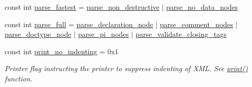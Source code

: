 \begin{DoxyCompactItemize}
\item 
const int \hyperlink{namespacerapidxml_a64da06dfdab7c86ca954bda4fecb978f}{parse\+\_\+fastest} = \hyperlink{namespacerapidxml_a45d4d8fef551beaaba23a83b847fd6a3}{parse\+\_\+non\+\_\+destructive} $\vert$ \hyperlink{namespacerapidxml_ac2d21ef14a4e8936b94aca5d38b1a74d}{parse\+\_\+no\+\_\+data\+\_\+nodes}
\item 
const int \hyperlink{namespacerapidxml_abb48dc65db75d9e49734bc5bd2fabbfc}{parse\+\_\+full} = \hyperlink{namespacerapidxml_a999d782659513f8015ea4236e3204c42}{parse\+\_\+declaration\+\_\+node} $\vert$ \hyperlink{namespacerapidxml_ae093dd49e2f59fa39eee95f1a6568e32}{parse\+\_\+comment\+\_\+nodes} $\vert$ \hyperlink{namespacerapidxml_a41002b49780a90a0bbcc28ce8b895fe4}{parse\+\_\+doctype\+\_\+node} $\vert$ \hyperlink{namespacerapidxml_a03fe68fcf5d28f38476e0fd31adecc4c}{parse\+\_\+pi\+\_\+nodes} $\vert$ \hyperlink{namespacerapidxml_a7ce8f40fda68338e20b56f41e48e49f3}{parse\+\_\+validate\+\_\+closing\+\_\+tags}
\item 
const int \hyperlink{namespacerapidxml_a65477b812a80f5bda693ec57e57de064}{print\+\_\+no\+\_\+indenting} = 0x1
\begin{DoxyCompactList}\small\item\em Printer flag instructing the printer to suppress indenting of X\+M\+L. See \hyperlink{namespacerapidxml_a0fb0be6eba49fb2e2646d5a72a0dc355}{print()} function. \end{DoxyCompactList}\end{DoxyCompactItemize}


